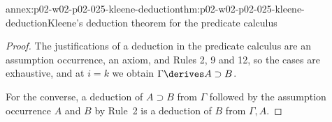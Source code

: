 \begin{annexitem}{annex:p02-w02-p02-025-kleene-deduction}{thm:p02-w02-p02-025-kleene-deduction}{Kleene's deduction theorem for the predicate calculus}
\begin{proof}
The justifications of a deduction in the predicate calculus are an
assumption occurrence, an axiom, and Rules 2, 9 and 12, so the cases are
exhaustive, and at \(i=k\) we obtain \(\Gamma\derives A\supset B\).

For the converse, a deduction of \(A\supset B\) from \(\Gamma\) followed by
the assumption occurrence \(A\) and \(B\) by Rule~2 is a deduction of \(B\)
from \(\Gamma,A\).
\end{proof}
\end{annexitem}

